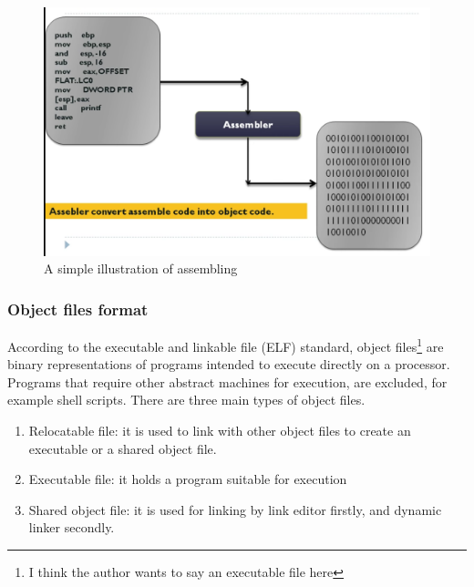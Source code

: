      
            \begin{figure}[H]
                \centering
                \includegraphics[scale = 0.22]
                {Images/concepts/Assembler.png}
                \caption[A simple illustration of assembling]%
                {A simple illustration of assembling\footnotemark}    
                \label{fig:Assembler}
            \end{figure}

        
        \subsubsection{Object files format}
        According to the executable and linkable file (ELF) standard, object files\footnote{I think the author wants to say an executable file here} are binary representations of programs intended to execute directly on a processor\cite{SCO-97}. Programs that require other abstract machines for execution, are excluded, for example shell scripts\cite{SCO-97}. There are three main types of object files.
            
          \begin{enumerate}
                \item Relocatable file: it is used to link with other object files to create an executable or a shared object file. 
                \item Executable file: it holds a program suitable for execution
                \item Shared object file: it is used for linking by link editor firstly, and dynamic linker secondly.
           \end{enumerate}
        
